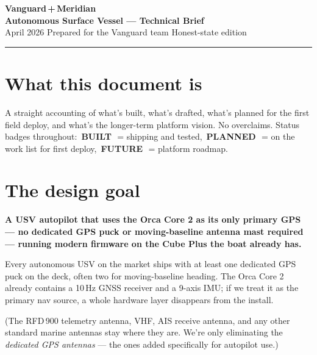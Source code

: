 \documentclass[10pt,a4paper]{article}
\newcommand{\statusbuilt}{{\color{white}\colorbox{mSafe}{\small\bfseries\,BUILT\,}}}
\newcommand{\statusplan}{{\color{white}\colorbox{mWarn}{\small\bfseries\,PLANNED\,}}}
\newcommand{\statusfuture}{{\color{white}\colorbox{mDim}{\small\bfseries\,FUTURE\,}}}
\begin{document}
\thispagestyle{empty}

\begin{center}
  {\Huge\bfseries\color{mCyan}Vanguard\,+\,Meridian}\\[3pt]
  {\large\bfseries Autonomous Surface Vessel — Technical Brief}\\[2pt]
  {\color{mDim}\small April 2026 \quad\textbullet\quad Prepared for the Vanguard team \quad\textbullet\quad Honest-state edition}
\end{center}
\vspace{2pt}
\rule{\textwidth}{0.4pt}

\section{What this document is}
A straight accounting of what's built, what's drafted, what's planned for
the first field deploy, and what's the longer-term platform vision. No
overclaims. Status badges throughout: \statusbuilt\ = shipping and
tested, \statusplan\ = on the work list for first deploy, \statusfuture\
= platform roadmap.

\section{The design goal}
\begin{tcolorbox}[colframe=mCyan, colback=white, title=\normalsize The Vanguard claim — once first deploy is proven]
\textbf{A USV autopilot that uses the Orca Core 2 as its only primary GPS
— no dedicated GPS puck or moving-baseline antenna mast required —
running modern firmware on the Cube Plus the boat already has.}
\end{tcolorbox}

Every autonomous USV on the market ships with at least one dedicated GPS
puck on the deck, often two for moving-baseline heading. The Orca Core 2
already contains a 10\,Hz GNSS receiver and a 9-axis IMU; if we treat it
as the primary nav source, a whole hardware layer disappears from the
install.

(The RFD\,900 telemetry antenna, VHF, AIS receive antenna, and any other
standard marine antennas stay where they are. We're only eliminating the
{\itshape dedicated GPS antennas} — the ones added specifically for
autopilot use.)
\end{document}
